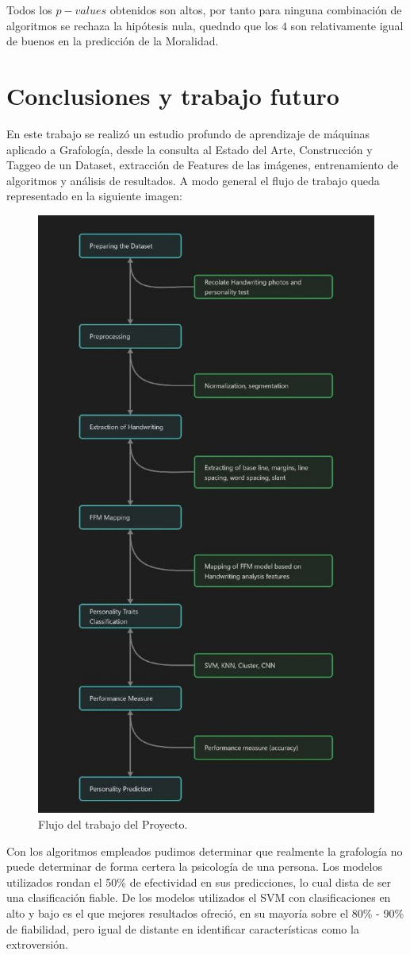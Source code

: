 \documentclass[10pt, a4paper]{article}
\begin{document}
    Todos los $p-values$ obtenidos son altos, por tanto para ninguna combinaci\'on de algoritmos se rechaza la hip\'otesis nula, quedndo 
    que los $4$ son relativamente igual de buenos en la predicci\'on de la Moralidad.

    \section{Conclusiones y trabajo futuro}
        En este trabajo se realiz\'o un estudio profundo de aprendizaje de m\'aquinas aplicado a Grafolog\'ia, desde la consulta al Estado del Arte, Construcci\'on y Taggeo de un Dataset, extracci\'on de Features de las im\'agenes, entrenamiento de algoritmos y an\'alisis de resultados. A modo general el flujo de trabajo queda representado en la siguiente imagen: 

        \begin{figure}[H]
            \centering
            \includegraphics[width = 0.4\linewidth]{photo_2023-05-29_02-40-00.jpg}
            \caption{Flujo del trabajo del Proyecto.}
        \end{figure}


        Con los algoritmos empleados pudimos determinar que realmente la grafolog\'ia no puede determinar de 
        forma certera la psicolog\'ia de una persona. Los modelos utilizados rondan el 50\% de efectividad en sus predicciones, 
        lo cual dista de ser una clasificaci\'on fiable. De los modelos utilizados el SVM con clasificaciones en alto y bajo es el que mejores 
        resultados ofreci\'o, en su mayor\'ia sobre el 80\% - 90\% de fiabilidad, pero igual de distante en identificar caracter\'isticas como la extroversi\'on.\\ 
\end{document}
